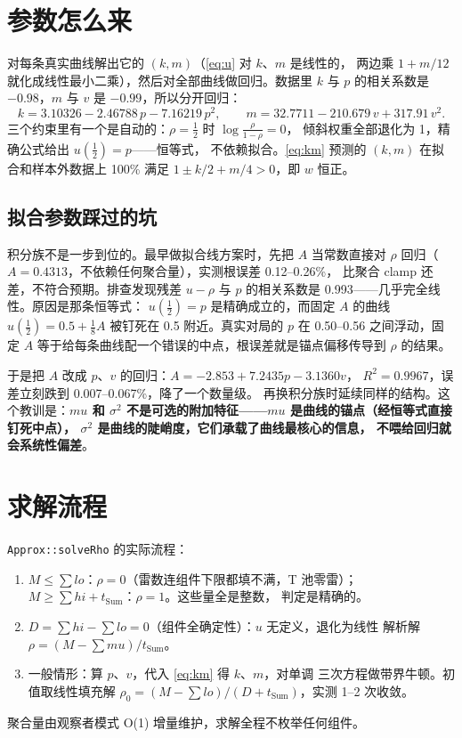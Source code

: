 \documentclass[UTF8,10pt]{ctexart}
\begin{document}
\section{参数怎么来}

对每条真实曲线解出它的 $(k,m)$（\eqref{eq:u} 对 $k$、$m$ 是线性的，
两边乘 $1+m/12$ 就化成线性最小二乘），然后对全部曲线做回归。数据里
$k$ 与 $p$ 的相关系数是 $-0.98$，$m$ 与 $v$ 是 $-0.99$，所以分开回归：
\begin{equation}\label{eq:km}
k = 3.10326 - 2.46788\,p - 7.16219\,p^2, \qquad
m = 32.7711 - 210.679\,v + 317.91\,v^2 .
\end{equation}
三个约束里有一个是自动的：$\rho=\frac12$ 时 $\log\tfrac{\rho}{1-\rho}=0$，
倾斜权重全部退化为 1，精确公式给出 $u(\frac12)=p$——恒等式，
不依赖拟合。\eqref{eq:km} 预测的 $(k,m)$ 在拟合和样本外数据上
100\% 满足 $1\pm k/2 + m/4 > 0$，即 $w$ 恒正。

\subsection{拟合参数踩过的坑}

积分族不是一步到位的。最早做拟合线方案时，先把 $A$ 当常数直接对
$\rho$ 回归（$A=0.4313$，不依赖任何聚合量），实测根误差 0.12--0.26\%，
比聚合 clamp 还差，不符合预期。排查发现残差 $u-\rho$ 与 $p$
的相关系数是 0.993——几乎完全线性。原因是那条恒等式：
$u(\frac12)=p$ 是精确成立的，而固定 $A$ 的曲线 $u(\frac12)=0.5+\frac18 A$
被钉死在 0.5 附近。真实对局的 $p$ 在 0.50--0.56 之间浮动，固定 $A$
等于给每条曲线配一个错误的中点，根误差就是锚点偏移传导到 $\rho$ 的结果。

于是把 $A$ 改成 $p$、$v$ 的回归：$A=-2.853+7.2435p-3.1360v$，
$R^2=0.9967$，误差立刻跌到 0.007--0.067\%，降了一个数量级。
再换积分族时延续同样的结构。这个教训是：\textbf{$mu$ 和 $\sigma^2$
不是可选的附加特征——$mu$ 是曲线的锚点（经恒等式直接钉死中点），
$\sigma^2$ 是曲线的陡峭度，它们承载了曲线最核心的信息，
不喂给回归就会系统性偏差}。

\section{求解流程}

\texttt{Approx::solveRho} 的实际流程：
\begin{enumerate}
\item $M\le\sum lo$：$\rho=0$（雷数连组件下限都填不满，T 池零雷）；
      $M\ge\sum hi+t_{\text{Sum}}$：$\rho=1$。这些量全是整数，
      判定是精确的。
\item $D=\sum hi-\sum lo=0$（组件全确定性）：$u$ 无定义，退化为线性
      解析解 $\rho=(M-\sum mu)/t_{\text{Sum}}$。
\item 一般情形：算 $p$、$v$，代入 \eqref{eq:km} 得 $k$、$m$，对单调
      三次方程做带界牛顿。初值取线性填充解
      $\rho_0=(M-\sum lo)/(D+t_{\text{Sum}})$，实测 1--2 次收敛。
\end{enumerate}
聚合量由观察者模式 O(1) 增量维护，求解全程不枚举任何组件。
\end{document}
